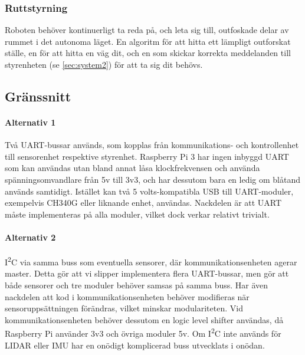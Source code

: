 \documentclass[a4paper,11pt]{article}
\begin{document}
\subsubsection{Ruttstyrning}
Roboten behöver kontinuerligt ta reda på, och leta sig till, outfoskade delar av rummet i det autonoma läget. En algoritm för att hitta ett lämpligt outforskat ställe, en för att hitta en väg dit, och en som skickar korrekta meddelanden till styrenheten (se \ref{sec:system2}) för att ta sig dit behövs.

\subsection{Gränssnitt} \label{ssec:brainInterface}

\paragraph{Alternativ 1}
Två UART-bussar används, som kopplas från kommunikations- och kontrollenhet till sensorenhet respektive styrenhet. Raspberry Pi 3 har ingen inbyggd UART som kan användas utan bland annat låsa klockfrekvensen och använda spänningsomvandlare från 5v till 3v3, och har dessutom bara en ledig om blåtand används samtidigt. Istället kan två 5 volts-kompatibla USB till UART-moduler, exempelvis CH340G eller liknande enhet, användas. Nackdelen är att UART måste implementeras på alla moduler, vilket dock verkar relativt trivialt. %


\paragraph{Alternativ 2}
I\textsuperscript{2}C via samma buss som eventuella sensorer, där kommunikationsenheten agerar master. Detta gör att vi slipper implementera flera UART-bussar, men gör att både sensorer och tre moduler behöver samsas på samma buss. Har även nackdelen att kod i kommunikationsenheten behöver modifieras när sensoruppsättningen förändras, vilket minskar modulariteten.
Vid kommunikationsenheten behöver dessutom en logic level shifter användas, då Raspberry Pi använder 3v3 och övriga moduler 5v. Om I\textsuperscript{2}C inte används för LIDAR eller IMU har en onödigt komplicerad buss utvecklats i onödan.
\end{document}
